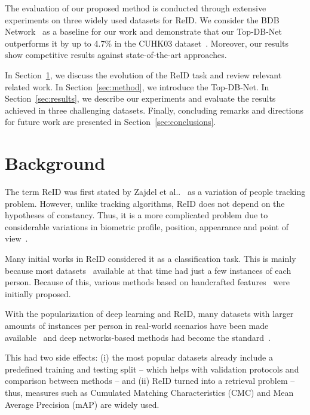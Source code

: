 \documentclass[a4paper,conference]{IEEEtran}
\makeatletter
\DeclareRobustCommand\onedot{\futurelet\@let@token\@onedot}
\def\@onedot{\ifx\@let@token.\else.\null\fi\xspace}
\def\etal{et al\onedot}
\makeatother
\begin{document}
The evaluation of our proposed method is conducted through extensive experiments on three widely used datasets for ReID. We consider the BDB Network~\cite{dai2019batch} as a baseline for our work and demonstrate that our Top-DB-Net outperforms it by up to 4.7\% in the CUHK03 dataset~\cite{li2014deepReID}. Moreover, our results show competitive results against state-of-the-art approaches.
 
In Section~\ref{sec:background}, we discuss the evolution of the ReID task and review relevant related work. In Section~\ref{sec:method}, we introduce the Top-DB-Net. In Section~\ref{sec:results}, we describe our experiments and evaluate the results achieved in three challenging datasets. Finally, concluding remarks and directions for future work are presented in Section~\ref{sec:conclusions}.
 
\section{Background}
\label{sec:background}
 
The term ReID was first stated by Zajdel \etal~\cite{zajdel2005keeping} as a variation of people tracking problem. However, unlike tracking algorithms, ReID does not depend on the hypotheses of constancy. Thus, it is a more complicated problem due to considerable variations in biometric profile, position, appearance and point of view~\cite{vezzani2013people}.
 
Many initial works in ReID considered it as a classification task. This is mainly because most datasets~\cite{gray2008viewpoint} available at that time had just a few instances of each person. Because of this, various methods based on handcrafted features~\cite{corvee2010person,cheng2011custom,hirzer2012dense,hirzer2012person,leng2015person} were initially proposed.
 
With the popularization of deep learning and ReID, many datasets with larger amounts of instances per person in real-world scenarios have been made available~\cite{zheng2015scalable,li2014deepReID,zhong2017re,zheng2017unlabeled,ristani2016MTMC} and deep networks-based methods had become the standard~\cite{torchreid,zhou2019osnet}.
 
This had two side effects: (i) the most popular datasets already include a predefined training and testing split -- which helps with validation protocols and comparison between methods -- and (ii) ReID turned into a retrieval problem -- thus, measures such as Cumulated Matching Characteristics (CMC) and Mean Average Precision (mAP) are widely used.
 
\end{document}
